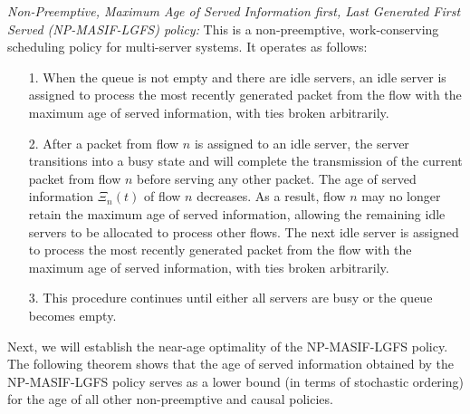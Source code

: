 \begin{definition} \emph{Non-Preemptive, Maximum Age of Served Information first, Last Generated First Served (NP-MASIF-LGFS) policy:} This is a non-preemptive, work-conserving scheduling policy for multi-server systems. It operates as follows:
\begin{itemize}
\item[1.] When the queue is not empty and there are idle servers, an idle server is assigned to process the most recently generated packet from the flow with the maximum age of served information, with ties broken arbitrarily. 

\item[2.] After a packet from flow $n$ is assigned to an idle server, the server transitions into a busy state and will complete the transmission of the current packet from flow $n$ before serving any other packet. The age of served information $\Xi_{n} (t)$ of flow $n$ decreases. As a result, flow $n$ may no longer retain the maximum age of served information, allowing the remaining idle servers to be allocated to process other flows. The next idle server is assigned to process the most recently generated packet from the flow with the maximum age of served information, with ties broken arbitrarily. 

\item[3.] This procedure continues until either all servers are busy or the queue becomes empty. 

\end{itemize}

\end{definition}


Next, we will establish the near-age optimality of the NP-MASIF-LGFS policy. %
The following theorem shows that the age of served information obtained by the NP-MASIF-LGFS policy serves as a lower bound (in terms of stochastic ordering) for the age of all other non-preemptive and causal policies. 

